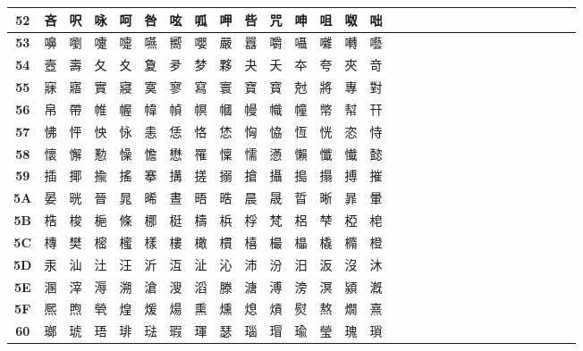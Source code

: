 \begin{table}[H]
\begin{tabular}{|Sc|Sc|Sc|Sc|Sc|Sc|Sc|Sc|Sc|Sc|Sc|Sc|Sc|Sc|Sc|}
\textbf{52} & 吝 & 呎 & 咏 & 呵 & 咎 & 呟 & 呱 & 呷 & 呰 & 咒 & 呻 & 咀 & 呶 & 咄 \\ \hline
\textbf{53} & 嚊 & 嚠 & 嚔 & 嚏 & 嚥 & 嚮 & 嚶 & 嚴 & 囂 & 嚼 & 囁 & 囃 & 囀 & 囈 \\ \hline
\textbf{54} & 壼 & 壽 & 夂 & 夊 & 夐 & 夛 & 梦 & 夥 & 夬 & 夭 & 夲 & 夸 & 夾 & 竒 \\ \hline
\textbf{55} & 寐 & 寤 & 實 & 寢 & 寞 & 寥 & 寫 & 寰 & 寶 & 寳 & 尅 & 將 & 專 & 對 \\ \hline
\textbf{56} & 帛 & 帶 & 帷 & 幄 & 幃 & 幀 & 幎 & 幗 & 幔 & 幟 & 幢 & 幤 & 幇 & 幵 \\ \hline
\textbf{57} & 怫 & 怦 & 怏 & 怺 & 恚 & 恁 & 恪 & 恷 & 恟 & 恊 & 恆 & 恍 & 恣 & 恃 \\ \hline
\textbf{58} & 懷 & 懈 & 懃 & 懆 & 憺 & 懋 & 罹 & 懍 & 懦 & 懣 & 懶 & 懺 & 懴 & 懿 \\ \hline
\textbf{59} & 插 & 揶 & 揄 & 搖 & 搴 & 搆 & 搓 & 搦 & 搶 & 攝 & 搗 & 搨 & 搏 & 摧 \\ \hline
\textbf{5A} & 晏 & 晄 & 晉 & 晁 & 晞 & 晝 & 晤 & 晧 & 晨 & 晟 & 晢 & 晰 & 暃 & 暈 \\ \hline
\textbf{5B} & 梏 & 梭 & 梔 & 條 & 梛 & 梃 & 檮 & 梹 & 桴 & 梵 & 梠 & 梺 & 椏 & 梍 \\ \hline
\textbf{5C} & 槫 & 樊 & 樒 & 櫁 & 樣 & 樓 & 橄 & 樌 & 橲 & 樶 & 橸 & 橇 & 橢 & 橙 \\ \hline
\textbf{5D} & 汞 & 汕 & 汢 & 汪 & 沂 & 沍 & 沚 & 沁 & 沛 & 汾 & 汨 & 汳 & 沒 & 沐 \\ \hline
\textbf{5E} & 溷 & 滓 & 溽 & 溯 & 滄 & 溲 & 滔 & 滕 & 溏 & 溥 & 滂 & 溟 & 潁 & 漑 \\ \hline
\textbf{5F} & 熈 & 煦 & 煢 & 煌 & 煖 & 煬 & 熏 & 燻 & 熄 & 熕 & 熨 & 熬 & 燗 & 熹 \\ \hline
\textbf{60} & 瑯 & 琥 & 珸 & 琲 & 琺 & 瑕 & 琿 & 瑟 & 瑙 & 瑁 & 瑜 & 瑩 & 瑰 & 瑣 \\ \hline
\end{tabular}
\end{table}

